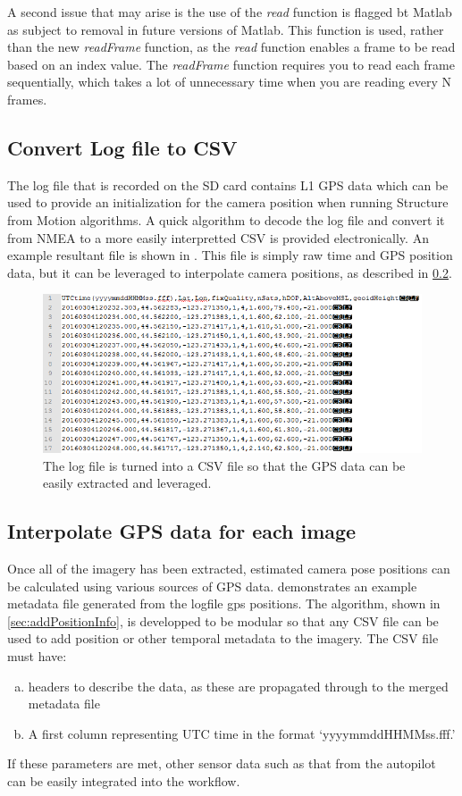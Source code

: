 	A second issue that may arise is the use of the \textit{read} function is flagged bt Matlab as subject to removal in future versions of Matlab.  This function is used, rather than the new \textit{readFrame} function, as the \textit{read} function enables a frame to be read based on an index value.  The \textit{readFrame} function requires you to read each frame sequentially, which takes a lot of unnecessary time when you are reading every N frames.  
	\subsection{Convert Log file to CSV}
	\label{ssec:convertLog2CSV}
	The log file that is recorded on the SD card contains L1 GPS data which can be used to provide an initialization for the camera position when running Structure from Motion algorithms.  A quick algorithm to decode the log file and convert it from NMEA to a more easily interpretted CSV is provided electronically.  An example resultant file is shown in .  This file is simply raw time and GPS position data, but it can be leveraged to interpolate camera positions, as described in \ref{ssec:InterpGPS}.
	
	\begin{figure}[H]
		\centering
		\includegraphics[scale = 0.6]{../figures/gpstxt.png}
		\caption{The log file is turned into a CSV file so that the GPS data can be easily extracted and leveraged.}
		\label{fig:gpstxt}
	\end{figure}
	
	\subsection{Interpolate GPS data for each image}
	\label{ssec:InterpGPS}
	Once all of the imagery has been extracted, estimated camera pose positions can be calculated using various sources of GPS data.   demonstrates an example metadata file generated from the logfile gps positions.  The algorithm, shown in \ref{sec:addPositionInfo}, is developped to be modular so that any CSV file can be used to add position or other temporal metadata to the imagery.  The CSV file must have:
	\begin{enumerate}[a)]
		\item headers to describe the data, as these are propagated through to the merged metadata file
		\item A first column representing UTC time in the format `yyyymmddHHMMss.fff.'
	\end{enumerate}
	If these parameters are met, other sensor data such as that from the autopilot can be easily integrated into the workflow.
	
